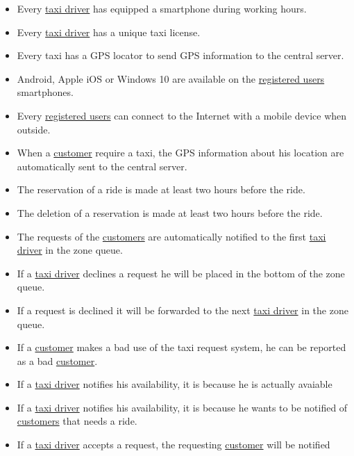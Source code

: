 			\begin{itemize}
				\item Every \hyperref[sec:tdriver]{taxi driver} has equipped a smartphone during working hours.

				\item Every \hyperref[sec:tdriver]{taxi driver} has a unique taxi license.

				\item Every taxi has a GPS locator to send GPS information to the central server.

				\item Android, Apple iOS or Windows 10 are available on the \hyperref[sec:ruser]{registered users} smartphones.

				\item Every \hyperref[sec:ruser]{registered users} can connect to the Internet with a mobile device when outside.

				\item When a \hyperref[sec:customer]{customer} require a taxi, the GPS information about his location are automatically sent to the central server.

				\item The reservation of a ride is made at least two hours before the ride.

				\item The deletion of a reservation is made at least two hours before the ride.

				\item The requests of the \hyperref[sec:customer]{customers} are automatically notified to the first \hyperref[sec:tdriver]{taxi driver} in the zone queue.

				\item If a \hyperref[sec:tdriver]{taxi driver} declines a request he will be placed in the bottom of the zone queue.

				\item If a request is declined it will be forwarded to the next \hyperref[sec:tdriver]{taxi driver} in the zone queue.

				\item If a \hyperref[sec:customer]{customer} makes a bad use of the taxi request system, he can be reported as a bad \hyperref[sec:customer]{customer}.

				\item If a \hyperref[sec:tdriver]{taxi driver} notifies his availability, it is because he is actually avaiable

				\item If a \hyperref[sec:tdriver]{taxi driver} notifies his availability, it is because he wants to be notified of \hyperref[sec:customer]{customers} that needs a ride.

				\item If a \hyperref[sec:tdriver]{taxi driver} accepts a request, the requesting \hyperref[sec:customer]{customer} will be notified
			\end{itemize}

